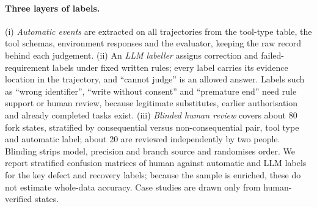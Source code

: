 \begin{table}[t]
\centering\scriptsize\setlength{\tabcolsep}{4pt}
\caption{Telecom holdout confirmation (34 tasks). All cells are placeholders. }
\label{tab:confirm}
\end{table}

\paragraph{Three layers of labels.} (i) \emph{Automatic events} are extracted on all trajectories from the tool-type table, the tool schemas, environment responses and the evaluator, keeping the raw record behind each judgement. (ii) An \emph{LLM labeller} assigns correction and failed-requirement labels under fixed written rules; every label carries its evidence location in the trajectory, and ``cannot judge'' is an allowed answer. Labels such as ``wrong identifier'', ``write without consent'' and ``premature end'' need rule support or human review, because legitimate substitutes, earlier authorisation and already completed tasks exist. (iii) \emph{Blinded human review} covers about 80 fork states, stratified by consequential versus non-consequential pair, tool type and automatic label; about 20 are reviewed independently by two people. Blinding strips model, precision and branch source and randomises order. We report stratified confusion matrices of human against automatic and LLM labels for the key defect and recovery labels; because the sample is enriched, these do not estimate whole-data accuracy. Case studies are drawn only from human-verified states.

